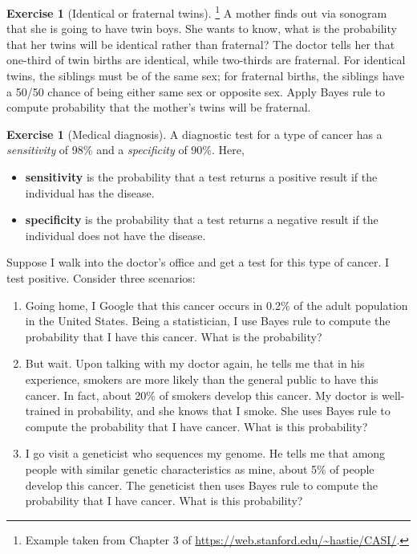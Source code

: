 \documentclass[11pt]{article}
\theoremstyle{definition}
\newtheorem{exercise}[]{Exercise}
\begin{document}
\begin{exercise}[Identical or fraternal twins]\footnote{
  Example taken from Chapter 3 of \url{https://web.stanford.edu/~hastie/CASI/}.
  }
  A mother finds out via sonogram that she is going to have twin boys.
  She wants to know, what is the probability that her twins will be
  identical rather than fraternal? The doctor tells her that one-third of twin births
  are identical, while two-thirds are fraternal.
  For identical twins, the siblings must be of the same sex; for fraternal births,
  the siblings have a 50/50 chance of being either same sex or opposite sex.
  Apply Bayes rule to compute probability that the mother's twins will be fraternal.
\end{exercise}

\begin{exercise}[Medical diagnosis]
  A diagnostic test for a type of cancer has a \textit{sensitivity} of 98\% and a
  \textit{specificity} of 90\%. Here,
  \begin{itemize}
    \item \textbf{sensitivity} is the probability that a test returns a positive result if the
individual has the disease.
    \item \textbf{specificity} is the probability that a test returns a negative result if the
individual does not have the disease.
  \end{itemize}

  Suppose I walk into the doctor's office and get a test for this type of cancer.
  I test positive. Consider three scenarios:
  \begin{enumerate}[label = (\alph*)]
    \item Going home, I Google that this cancer occurs in 0.2\% of the
    adult population in the United States.
    Being a statistician, I use Bayes rule to compute the probability that I have
    this cancer. What is the probability?
    \item But wait. Upon talking with my doctor again, he tells me that in his experience,
    smokers are more likely than the general public to have this cancer.
    In fact, about 20\% of smokers develop this cancer. My doctor is well-trained in
    probability, and she knows that I smoke.
    She uses Bayes rule to compute the probability that I have cancer. What is
    this probability?
    \item I go visit a geneticist who sequences my genome.
    He tells me that among people with similar genetic characteristics as mine,
    about 5\% of people develop this cancer.
    The geneticist then uses Bayes rule to compute the probability that
    I have cancer. What is this probability?
  \end{enumerate}
  \label{ex:diagnostic}
\end{exercise}
\end{document}
